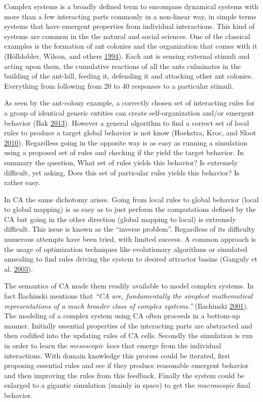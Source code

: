 \documentclass[
]{book}
\begin{document}
Complex systems is a broadly defined term to encompass dynamical systems with more than a few interacting parts commonly in a non-linear way, in simple terms systems that have emergent properties from individual interactions. This kind of systems are common in the the natural and social sciences. One of the classical examples is the formation of ant colonies and the organization that comes with it (Hölldobler, Wilson, and others \protect\hyperlink{ref-holldobler1994journey}{1994}). Each ant is sensing external stimuli and acting upon them, the cumulative reactions of all the ants culminates in the building of the ant-hill, feeding it, defending it and attacking other ant colonies. Everything from following from 20 to 40 responses to a particular stimuli.

As seen by the ant-colony example, a correctly chosen set of interacting rules for a group of identical generic entities can create self-organization and/or emergent behavior (Bak \protect\hyperlink{ref-bak2013nature}{2013}). However a general algorithm to find a correct set of local rules to produce a target global behavior is not know (Hoekstra, Kroc, and Sloot \protect\hyperlink{ref-hoekstra2010simulating}{2010}). Regardless going in the opposite way is as easy as running a simulation using a proposed set of rules and checking if the yield the target behavior.
In summary the question, What set of rules yields this behavior? Is extremely difficult, yet asking, Does this set of particular rules yields this behavior? Is rather easy.

In CA the same dichotomy arises. Going from local rules to global behavior (local to global mapping) is as easy as to just perform the computations defined by the CA but going in the other direction (global mapping to local) is extremely difficult. This issue is known as the ``inverse problem''. Regardless of its difficulty numerous attempts have been tried, with limited success. A common approach is the usage of optimization techniques like evolutionary algorithms or simulated annealing to find rules driving the system to desired attractor basins (Ganguly et al. \protect\hyperlink{ref-ganguly2003survey}{2003}).

The semantics of CA made them readily available to model complex systems. In fact Ilachinski mentions that \emph{``CA are, fundamentally the simplest mathematical representations of a much broader class of complex systems.''} (Ilachinski \protect\hyperlink{ref-ilachinski2001cellular}{2001}). The modeling of a complex system using CA often proceeds in a bottom-up manner. Initially essential properties of the interacting parts are abstracted and then codified into the updating rules of CA cells. Secondly the simulation is run in order to learn the \emph{mesoscopic laws} that emerge from the individual interactions. With domain knowledge this process could be iterated, first proposing essential rules and see if they produce reasonable emergent behavior and then improving the rules from this feedback. Finally the system could be enlarged to a gigantic simulation (mainly in space) to get the \emph{macroscopic} final behavior.
\end{document}
